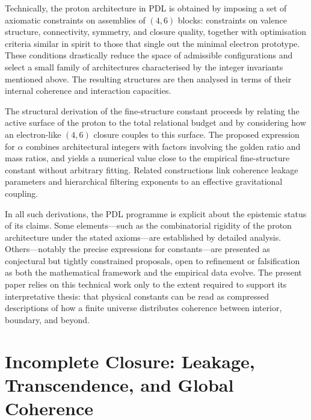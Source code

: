 \documentclass[11pt,a4paper]{article}
\theoremstyle{definition}
\begin{document}
Technically, the proton architecture in PDL is obtained by imposing a set of axiomatic constraints on assemblies of \((4,6)\) blocks: constraints on valence structure, connectivity, symmetry, and closure quality, together with optimisation criteria similar in spirit to those that single out the minimal electron prototype.\cite{Laubscher_ProtonArch_v1_2024,Laubscher_ProtonArch_v2_2024} These conditions drastically reduce the space of admissible configurations and select a small family of architectures characterised by the integer invariants mentioned above. The resulting structures are then analysed in terms of their internal coherence and interaction capacities.

The structural derivation of the fine-structure constant proceeds by relating the active surface of the proton to the total relational budget and by considering how an electron-like \((4,6)\) closure couples to this surface.\cite{Laubscher_Alpha_v2_2024,Laubscher_Born_Golden_v2_2024} The proposed expression for \(\alpha\) combines architectural integers with factors involving the golden ratio and mass ratios, and yields a numerical value close to the empirical fine-structure constant without arbitrary fitting. Related constructions link coherence leakage parameters and hierarchical filtering exponents to an effective gravitational coupling.\cite{Laubscher_Exponent18_v2_2024,Laubscher_UniversalCoherenceLeakage_2024}

In all such derivations, the PDL programme is explicit about the epistemic status of its claims. Some elements---such as the combinatorial rigidity of the proton architecture under the stated axioms---are established by detailed analysis.\cite{Laubscher_ProtonArch_v2_2024,Laubscher_PDL_GlobalMapping_v6_2024} Others---notably the precise expressions for constants---are presented as conjectural but tightly constrained proposals, open to refinement or falsification as both the mathematical framework and the empirical data evolve.\cite{Laubscher_Alpha_v2_2024,Laubscher_PDL_Position_2024} The present paper relies on this technical work only to the extent required to support its interpretative thesis: that physical constants can be read as compressed descriptions of how a finite universe distributes coherence between interior, boundary, and beyond.

\section{Incomplete Closure: Leakage, Transcendence, and Global Coherence}
\label{sec:leakage_transcendence}
\end{document}
